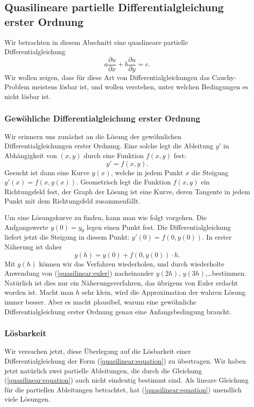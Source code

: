 \subsection{Quasilineare partielle Differentialgleichung erster Ordnung}
Wir betrachten in diesem Abschnitt eine quaslineare partielle 
Differentialgleichung
\begin{equation}
a\frac{\partial u}{\partial x}
+
b\frac{\partial u}{\partial y}
=
c.
\label{quasilinear:equation}
\end{equation}
Wir wollen zeigen, dass für diese Art von Differentialgleichungen
das Cauchy-Problem meistens lösbar ist, und wollen verstehen,
unter welchen Bedingungen es nicht lösbar ist.

\subsubsection{Gewöhliche Differentialgleichung erster Ordnung}
Wir erinnern uns zunächst an die Lösung der gewöhnlichen
Differentialgleichungen erster Ordnung.
Eine solche legt die Ableitung $y'$ in Abhängigkeit von 
$(x,y)$ durch eine Funktion $f(x,y)$ fest: 
\[
y'=f(x,y).
\]
Gesucht ist dann eine Kurve $y(x)$, welche
in jedem Punkt $x$ die Steigung $y'(x)=f(x,y(x))$.
Geometrisch legt die Funktion $f(x,y)$ ein Richtungsfeld fest,
der Graph der Lösung ist eine Kurve, deren Tangente in jedem
Punkt mit dem Richtungsfeld zusammenfällt.

Um eine Lösungskurve zu finden, kann man wie folgt vorgehen.
Die Anfgangswerte  $y(0)=y_0$ legen einen Punkt fest.
Die Differentialgleichung liefert jetzt die Steigung in
diesem Punkt: $y'(0)=f(0,y(0))$.
In erster Näherung ist daher
\begin{equation}
y(h)=y(0)+f(0,y(0))\cdot h.
\label{quasilinear:euler}
\end{equation}
Mit $y(h)$ können wir das Verfahren wiederholen, und durch
wiederholte Anwendung von (\ref{quasilinear:euler})
nacheinander $y(2h)$, $y(3h)$,\dots bestimmen.
Natürlich ist dies nur ein Näherungsverfahren, das übrigens
von Euler erdacht worden ist. Macht man $h$ sehr klein, wird
die Approximation der wahren Lösung immer besser.
Aber es macht plausibel, warum eine gewöhnliche Differentialgleichung
erster Ordnung genau eine Anfangsbedingung braucht.

\subsubsection{Lösbarkeit}
Wir versuchen jetzt, diese Überlegung auf die Lösbarkeit einer
Differentialgleichung der Form (\ref{quasilinear:equation}) zu 
übertragen.
Wir haben jetzt natürlich zwei partielle Ableitungen, die
durch die Gleichung (\ref{quasilinear:equation}) auch nicht
eindeutig bestimmt sind.
Als lineare Gleichung für die partiellen
Ableitungen betrachtet, hat (\ref{quasilinear:equation}) unendlich 
viele Lösungen.


